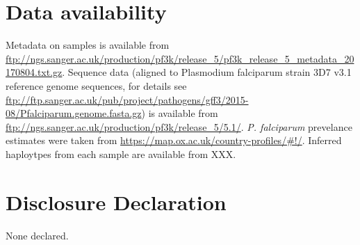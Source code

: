 \documentclass[9pt,lineno]{elife}
\begin{document}
\section{Data availability}
Metadata on samples is available from \url{ftp://ngs.sanger.ac.uk/production/pf3k/release_5/pf3k_release_5_metadata_20170804.txt.gz}.  Sequence data (aligned to Plasmodium falciparum strain 3D7 v3.1 reference genome sequences, for details see \url{      ftp://ftp.sanger.ac.uk/pub/project/pathogens/gff3/2015-08/Pfalciparum.genome.fasta.gz}) is available from  \url{ftp://ngs.sanger.ac.uk/production/pf3k/release_5/5.1/}.  {\it P. falciparum} prevelance estimates were taken from \url{https://map.ox.ac.uk/country-profiles/#!/}.  Inferred haploytpes from each sample are available from XXX.


\section{Disclosure Declaration}
None declared.



\end{document}
